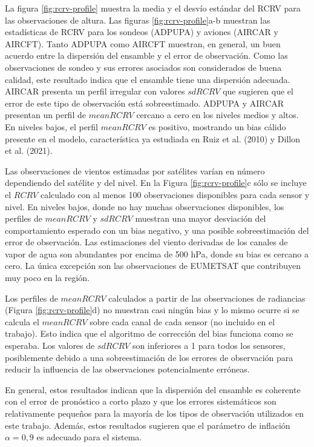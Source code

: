 \documentclass[12pt,oneside,a4paper]{reedthesis}
\begin{document}
La figura \ref{fig:rcrv-profile} muestra la media y el desvío estándar del RCRV para las observaciones de altura. Las figuras \ref{fig:rcrv-profile}a-b muestran las estadísticas de RCRV para los sondeos (ADPUPA) y aviones (AIRCAR y AIRCFT). Tanto ADPUPA como AIRCFT muestran, en general, un buen acuerdo entre la dispersión del ensamble y el error de observación. Como las observaciones de sondeo y sus errores asociados son considerados de buena calidad, este resultado indica que el ensamble tiene una dispersión adecuada. AIRCAR presenta un perfil irregular con valores \(sdRCRV\) que sugieren que el error de este tipo de observación está sobreestimado. ADPUPA y AIRCAR presentan un perfil de \(meanRCRV\) cercano a cero en los niveles medios y altos. En niveles bajos, el perfil \(meanRCRV\) es positivo, mostrando un bias cálido presente en el modelo, característica ya estudiada en Ruiz et al. (2010) y Dillon et al. (2021).

Las observaciones de vientos estimadas por satélites varían en número dependiendo del satélite y del nivel. En la Figura \ref{fig:rcrv-profile}c sólo se incluye el \(RCRV\) calculado con al menos 100 observaciones disponibles para cada sensor y nivel. En niveles bajos, donde no hay muchas observaciones disponibles, los perfiles de \(meanRCRV\) y \(sdRCRV\) muestran una mayor desviación del comportamiento esperado con un bias negativo, y una posible sobreestimación del error de observación. Las estimaciones del viento derivadas de los canales de vapor de agua son abundantes por encima de 500 hPa, donde su bias es cercano a cero. La única excepción son las observaciones de EUMETSAT que contribuyen muy poco en la región.

Los perfiles de \(meanRCRV\) calculados a partir de las observaciones de radiancias (Figura \ref{fig:rcrv-profile}d) no muestran casi ningún bias y lo mismo ocurre si se calcula el \(mean RCRV\) sobre cada canal de cada sensor (no incluido en el trabajo). Esto indica que el algoritmo de corrección del bias funciona como se esperaba. Los valores de \(sd RCRV\) son inferiores a 1 para todos los sensores, posiblemente debido a una sobreestimación de los errores de observación para reducir la influencia de las observaciones potencialmente erróneas.

En general, estos resultados indican que la dispersión del ensamble es coherente con el error de pronóstico a corto plazo y que los errores sistemáticos son relativamente pequeños para la mayoría de los tipos de observación utilizados en este trabajo. Además, estos resultados sugieren que el parámetro de inflación \(\alpha = 0,9\) es adecuado para el sistema.
\end{document}
